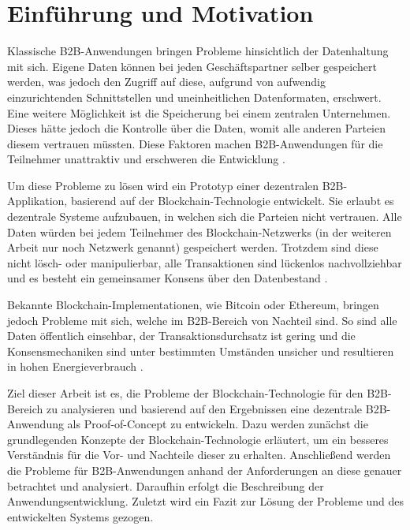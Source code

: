 \chapter{Einführung und Motivation}
\label{cha:einfuehrung}

Klassische B2B-Anwendungen bringen Probleme hinsichtlich der Datenhaltung mit sich. Eigene Daten können bei jeden Geschäftspartner selber gespeichert werden, was jedoch den Zugriff auf diese, aufgrund von aufwendig einzurichtenden Schnittstellen und uneinheitlichen Datenformaten, erschwert. Eine weitere Möglichkeit ist die Speicherung bei einem zentralen Unternehmen. Dieses hätte jedoch die Kontrolle über die Daten, womit alle anderen Parteien diesem vertrauen müssten. Diese Faktoren machen B2B-Anwendungen für die Teilnehmer unattraktiv und erschweren die Entwicklung \cite{KorpelaDigitalSupplyChain2017}\cite{WustyouneedBlockchain2017}.

Um diese Probleme zu lösen wird ein Prototyp einer dezentralen B2B-Applikation, basierend auf der Blockchain-Technologie entwickelt. Sie erlaubt es dezentrale Systeme aufzubauen, in welchen sich die Parteien nicht vertrauen. Alle Daten würden bei jedem Teilnehmer des Blockchain-Netzwerks (in der weiteren Arbeit nur noch Netzwerk genannt) gespeichert werden. Trotzdem sind diese nicht lösch- oder manipulierbar, alle Transaktionen sind lückenlos nachvollziehbar und es besteht ein gemeinsamer Konsens über den Datenbestand \cite{CrosbyBlockChainTechnologyBitcoin2016}.

Bekannte Blockchain-Implementationen, wie Bitcoin oder Ethereum, bringen jedoch Probleme mit sich, welche im B2B-Bereich von Nachteil sind. So sind alle Daten öffentlich einsehbar, der Transaktionsdurchsatz ist gering und die Konsensmechaniken sind unter bestimmten Umständen unsicher und resultieren in hohen Energieverbrauch \cite{Gramolidangerprivateblockchains2016}\cite{NakamotoBitcoinPeertoPeerElectronic2008}\cite{EthereumTeamEthereumWhitePaper2017}. 

Ziel dieser Arbeit ist es, die Probleme der Blockchain-Technologie für den B2B-Bereich zu analysieren und basierend auf den Ergebnissen eine dezentrale B2B-Anwendung als Proof-of-Concept zu entwickeln. Dazu werden zunächst die grundlegenden Konzepte der Blockchain-Technologie erläutert, um ein besseres Verständnis für die Vor- und Nachteile dieser zu erhalten. Anschließend werden die Probleme für B2B-Anwendungen anhand der Anforderungen an diese genauer betrachtet und analysiert. Daraufhin erfolgt die Beschreibung der Anwendungsentwicklung. Zuletzt wird ein Fazit zur Lösung der Probleme und des entwickelten Systems gezogen.

